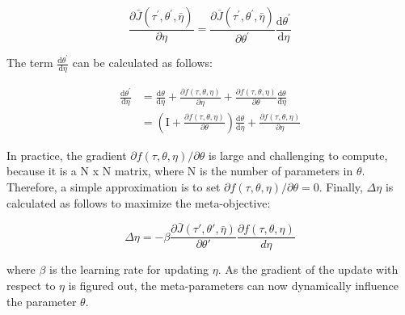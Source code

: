 \[\frac{\partial \bar{J}\left(\tau^{\prime}, \theta^{\prime}, \bar{\eta}\right)}{\partial \eta}=\frac{\partial \bar{J}\left(\tau^{\prime}, \theta^{\prime}, \bar{\eta}\right)}{\partial \theta^{\prime}} \frac{\mathrm{d} \theta^{\prime}}{\mathrm{d} \eta}\]

The term $\frac{\mathrm{d} \theta^{\prime}}{\mathrm{d} \eta}$ can be calculated as follows:

\begin{align*}
	\frac{\mathrm{d} \theta^{\prime}}{\mathrm{d} \eta}&=\frac{\mathrm{d} \theta}{\mathrm{d} \eta}+\frac{\partial f(\tau, \theta, \eta)}{\partial \eta}+\frac{\partial f(\tau, \theta, \eta)}{\partial \theta} \frac{\mathrm{d} \theta}{\mathrm{d} \eta} \\
	&=\left(\mathrm{I}+\frac{\partial f(\tau, \theta, \eta)}{\partial \theta}\right) \frac{\mathrm{d} \theta}{\mathrm{d} \eta}+\frac{\partial f(\tau, \theta, \eta)}{\partial \eta}
\end{align*}

In practice, the gradient $\partial f(\tau, \theta, \eta) / \partial \theta$ is large and challenging to compute, because it is a N x N matrix, where N is the number of parameters in $\theta$. Therefore, a simple approximation is to set $\partial f(\tau, \theta, \eta) / \partial \theta=0$. Finally, $\Delta\eta$ is calculated as follows to maximize the meta-objective:

\[\Delta \eta = -\beta \frac{\partial \bar{J}(\tau', \theta', \bar{\eta})}{\partial \theta'} \frac{\partial f(\tau, \theta, \eta)}{d\eta}\]

where $\beta$ is the learning rate for updating $\eta$. As the gradient of the update with respect to $\eta$ is figured out, the meta-parameters can now dynamically influence the parameter $\theta$.

